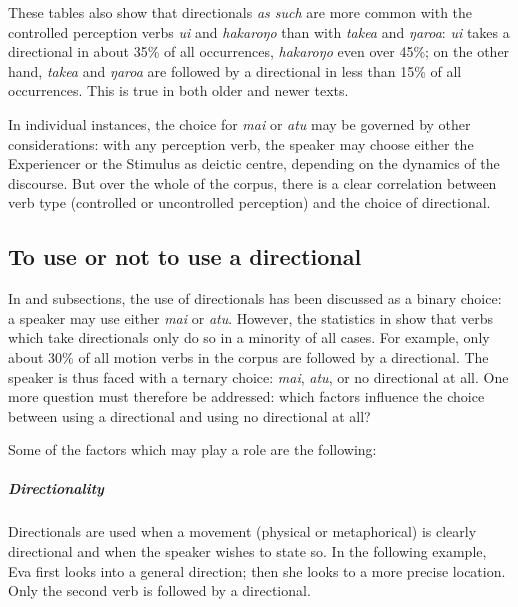 
These tables also show that directionals \textit{as such} are more common with the controlled perception verbs \textit{u{\ꞌ}i} and \textit{hakaroŋo} than with \textit{take{\ꞌ}a} and \textit{ŋaro{\ꞌ}a}: \textit{u{\ꞌ}i} takes a directional in about 35\% of all occurrences, \textit{hakaroŋo} even over 45\%; on the other hand, \textit{take{\ꞌ}a} and \textit{ŋaro{\ꞌ}a} are followed by a directional in less than 15\% of all occurrences. This is true in both older and newer texts.

\largerpage
In individual instances, the choice for \textit{mai} or \textit{atu} may be governed by other considerations: with any perception verb, the speaker may choose either the Experiencer or the Stimulus as deictic centre, depending on the dynamics of the discourse. But over the whole of the corpus, there is a clear correlation between verb type (controlled or uncontrolled perception) and the choice of directional.

\subsection{To use or not to use a directional}\label{sec:7.5.3}
In  and subsections, the use of directionals has been discussed as a binary choice: a speaker may use either \textit{mai} or \textit{atu}. However, the statistics in  show that verbs which take directionals only do so in a minority of all cases. For example, only about 30\% of all motion verbs in the corpus are followed by a directional. The speaker is thus faced with a ternary choice: \textit{mai}, \textit{atu}, or no directional at all. One more question must therefore be addressed: which factors influence the choice between using a directional and using no directional at all?

Some of the factors which may play a role are the following:

\subparagraph{Directionality} Directionals are used when a movement (physical or metaphorical) is clearly directional and when the speaker wishes to state so. In the following example, Eva first looks into a general direction; then she looks to a more precise location. Only the second verb is followed by a directional.

